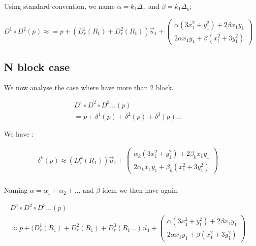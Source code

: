 Using standard convention, we name $\alpha = k_1  \Delta_x $ and $\beta = k_1  \Delta_y$;

\begin{equation}
	D^1 \circ D^2 (p) 
	\approx
	= p +    (D^1_r(R_1) + D^2_r(R_1))  \vec{u}_1  
	  +\begin{pmatrix} \alpha(3 x_1^2 + y_1^2 ) +2\beta x_1 y_1   \\ 2  \alpha x_1 y_1 +  \beta( x_1^2 + 3 y_1^2)  \end{pmatrix}
\end{equation}


\subsection{N block case}

We now analyse the case where have more than $2$ block.  


\begin{equation}
\begin{multlined}
	D^1 \circ D^2 \circ D^3 \dots (p)  \\
	= p +\delta^1(p) +\delta^2(p) + \delta^3(p) \dots 
\end{multlined}
\end{equation}

We have :

\begin{equation}
\begin{multlined}
        \delta^k(p)  
	\approx  (D^k_r(R_1))  \vec{u}_1  
          +\begin{pmatrix} \alpha_k(3 x_1^2 + y_1^2 ) +2\beta_k x_1 y_1   \\ 2  \alpha_k x_1 y_1 +  \beta_k( x_1^2 + 3 y_1^2)  \end{pmatrix} \\
\end{multlined}
\end{equation}

Naming $\alpha =  \alpha_1+\alpha_2 + \dots$ and $\beta$ idem we then have again:


\begin{equation}
\begin{multlined}
	D^1 \circ D^2 \circ D^3 \dots (p)  \\
	\approx  p + (D^1_r(R_1) + D^2_r(R_1) +  D^3_r(R_1 \dots )  \vec{u}_1
	  +\begin{pmatrix} \alpha(3 x_1^2 + y_1^2 ) +2\beta x_1 y_1   \\ 2  \alpha x_1 y_1 +  \beta( x_1^2 + 3 y_1^2)  \end{pmatrix}
\end{multlined}
\end{equation}

